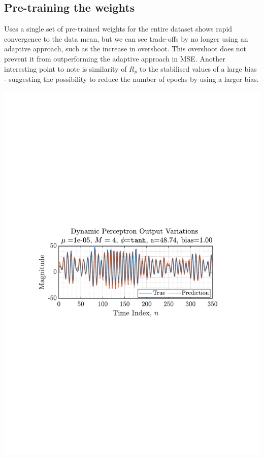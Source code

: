 \documentclass[12pt]{article}
\numberwithin{equation}{section}
\begin{document}
	\subsection{Pre-training the weights} \label{sec: 4-5-weight-training-dynamic-perceptron}
		\begin{minipage}[b]{0.49\textwidth}
			Uses a single set of pre-trained weights for the entire dataset shows rapid convergence to the data mean, but we can see trade-offs by no longer using an adaptive approach, such as the increase in overshoot. This overshoot does not prevent it from outperforming the adaptive approach in MSE. Another interesting point to note is similarity of $R_p$ to the stabilised values of a large bias - suggesting the possibility to reduce the number of epochs by using a larger bias.
		\end{minipage}%
		\begin{minipage}{0.04\textwidth}
			\hspace*{0.04\textwidth}
		\end{minipage}%
		\begin{minipage}[b]{0.49\textwidth}
			\centering
			\includegraphics[trim={2.2cm 11.2cm 3.15cm  11.2cm}, clip, width=\textwidth]{../MATLAB/figures/q4_5_fig01.pdf} 
			\captionsetup{justification=centering}
			\label{fig: 4-5}
		\end{minipage}%
\end{document}
